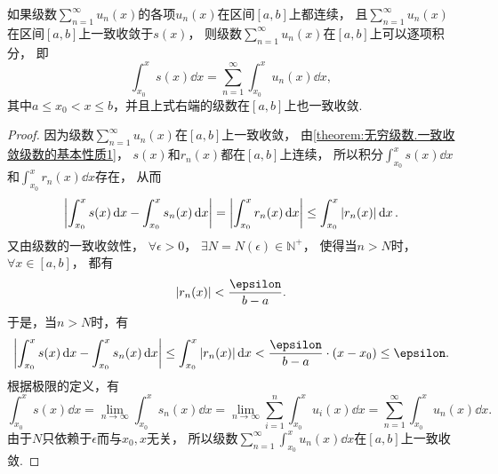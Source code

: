 \begin{property}\label{theorem:无穷级数.一致收敛级数的基本性质3}
如果级数\(\sum_{n=1}^\infty u_n(x)\)的各项\(u_n(x)\)在区间\([a,b]\)上都连续，
且\(\sum_{n=1}^\infty u_n(x)\)在区间\([a,b]\)上一致收敛于\(s(x)\)，
则级数\(\sum_{n=1}^\infty u_n(x)\)在\([a,b]\)上可以逐项积分，
即\[
	\int_{x_0}^x s(x) \dd{x}
	= \sum_{n=1}^\infty \int_{x_0}^x u_n(x) \dd{x},
\]
其中\(a \leq x_0 < x \leq b\)，并且上式右端的级数在\([a,b]\)上也一致收敛.
\begin{proof}
因为级数\(\sum_{n=1}^\infty u_n(x)\)在\([a,b]\)上一致收敛，
由\cref{theorem:无穷级数.一致收敛级数的基本性质1}，
\(s(x)\)和\(r_n(x)\)都在\([a,b]\)上连续，
所以积分\(\int_{x_0}^x s(x) \dd{x}\)和\(\int_{x_0}^x r_n(x) \dd{x}\)存在，
从而\[
	\abs{\int_{x_0}^x s(x) \dd{x} - \int_{x_0}^x s_n(x) \dd{x}}
	= \abs{\int_{x_0}^x r_n(x) \dd{x}}
	\leq \int_{x_0}^x \abs{r_n(x)} \dd{x}.
\]
又由级数的一致收敛性，
\(\forall\epsilon>0\)，
\(\exists N = N(\epsilon) \in \mathbb{N}^+\)，
使得当\(n > N\)时，
\(\forall x \in [a,b]\)，
都有\[
	\abs{r_n(x)} < \frac{\epsilon}{b-a}.
\]
于是，当\(n > N\)时，有\[
	\abs{\int_{x_0}^x s(x) \dd{x} - \int_{x_0}^x s_n(x) \dd{x}}
	\leq \int_{x_0}^x \abs{r_n(x)} \dd{x}
	< \frac{\epsilon}{b-a} \cdot (x-x_0)
	\leq \epsilon.
\]
根据极限的定义，有\[
	\int_{x_0}^x s(x) \dd{x}
	= \lim_{n\to\infty} \int_{x_0}^x s_n(x) \dd{x}
	= \lim_{n\to\infty} \sum_{i=1}^n \int_{x_0}^x u_i(x) \dd{x}
	= \sum_{n=1}^\infty \int_{x_0}^x u_n(x) \dd{x}.
\]
由于\(N\)只依赖于\(\epsilon\)而与\(x_0,x\)无关，
所以级数\(\sum_{n=1}^\infty \int_{x_0}^x u_n(x) \dd{x}\)在\([a,b]\)上一致收敛.
\end{proof}
\end{property}

